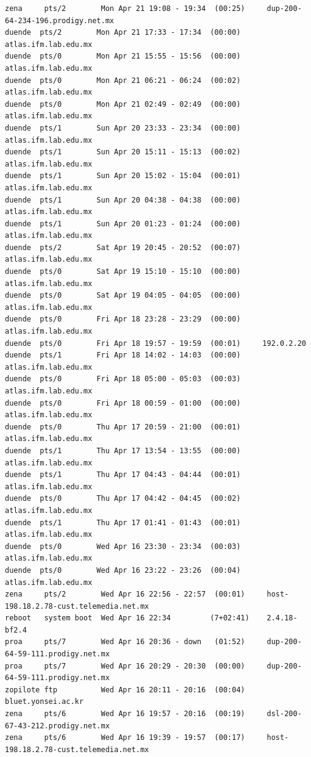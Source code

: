 \begin{lstlisting}[style=terminal]
zena     pts/2        Mon Apr 21 19:08 - 19:34  (00:25)     dup-200-64-234-196.prodigy.net.mx
duende  pts/2        Mon Apr 21 17:33 - 17:34  (00:00)     atlas.ifm.lab.edu.mx
duende  pts/0        Mon Apr 21 15:55 - 15:56  (00:00)     atlas.ifm.lab.edu.mx
duende  pts/0        Mon Apr 21 06:21 - 06:24  (00:02)     atlas.ifm.lab.edu.mx
duende  pts/0        Mon Apr 21 02:49 - 02:49  (00:00)     atlas.ifm.lab.edu.mx
duende  pts/1        Sun Apr 20 23:33 - 23:34  (00:00)     atlas.ifm.lab.edu.mx
duende  pts/1        Sun Apr 20 15:11 - 15:13  (00:02)     atlas.ifm.lab.edu.mx
duende  pts/1        Sun Apr 20 15:02 - 15:04  (00:01)     atlas.ifm.lab.edu.mx
duende  pts/1        Sun Apr 20 04:38 - 04:38  (00:00)     atlas.ifm.lab.edu.mx
duende  pts/1        Sun Apr 20 01:23 - 01:24  (00:00)     atlas.ifm.lab.edu.mx
duende  pts/2        Sat Apr 19 20:45 - 20:52  (00:07)     atlas.ifm.lab.edu.mx
duende  pts/0        Sat Apr 19 15:10 - 15:10  (00:00)     atlas.ifm.lab.edu.mx
duende  pts/0        Sat Apr 19 04:05 - 04:05  (00:00)     atlas.ifm.lab.edu.mx
duende  pts/0        Fri Apr 18 23:28 - 23:29  (00:00)     atlas.ifm.lab.edu.mx
duende  pts/0        Fri Apr 18 19:57 - 19:59  (00:01)     192.0.2.20
duende  pts/1        Fri Apr 18 14:02 - 14:03  (00:00)     atlas.ifm.lab.edu.mx
duende  pts/0        Fri Apr 18 05:00 - 05:03  (00:03)     atlas.ifm.lab.edu.mx
duende  pts/0        Fri Apr 18 00:59 - 01:00  (00:00)     atlas.ifm.lab.edu.mx
duende  pts/0        Thu Apr 17 20:59 - 21:00  (00:01)     atlas.ifm.lab.edu.mx
duende  pts/1        Thu Apr 17 13:54 - 13:55  (00:00)     atlas.ifm.lab.edu.mx
duende  pts/1        Thu Apr 17 04:43 - 04:44  (00:01)     atlas.ifm.lab.edu.mx
duende  pts/0        Thu Apr 17 04:42 - 04:45  (00:02)     atlas.ifm.lab.edu.mx
duende  pts/1        Thu Apr 17 01:41 - 01:43  (00:01)     atlas.ifm.lab.edu.mx
duende  pts/0        Wed Apr 16 23:30 - 23:34  (00:03)     atlas.ifm.lab.edu.mx
duende  pts/0        Wed Apr 16 23:22 - 23:26  (00:04)     atlas.ifm.lab.edu.mx
zena     pts/2        Wed Apr 16 22:56 - 22:57  (00:01)     host-198.18.2.78-cust.telemedia.net.mx
reboot   system boot  Wed Apr 16 22:34         (7+02:41)    2.4.18-bf2.4
proa     pts/7        Wed Apr 16 20:36 - down   (01:52)     dup-200-64-59-111.prodigy.net.mx
proa     pts/7        Wed Apr 16 20:29 - 20:30  (00:00)     dup-200-64-59-111.prodigy.net.mx
zopilote ftp          Wed Apr 16 20:11 - 20:16  (00:04)     bluet.yonsei.ac.kr
zena     pts/6        Wed Apr 16 19:57 - 20:16  (00:19)     dsl-200-67-43-212.prodigy.net.mx
zena     pts/6        Wed Apr 16 19:39 - 19:57  (00:17)     host-198.18.2.78-cust.telemedia.net.mx

\end{lstlisting}

